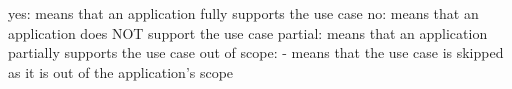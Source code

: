 yes:  means that an application fully supports the use case \newline
no:  means that an application does NOT support the use case \newline
partial:  means that an application partially supports the use case \newline
out of scope: - means that the use case is skipped as it is out of the application's scope \newline
